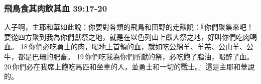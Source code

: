 \subsubsection{飛鳥食其肉飲其血 39:17-20}
人子啊，主耶和華如此說：你要對各類的飛鳥和田野的走獸說：『你們聚集來吧！要從四方聚到我為你們獻祭之地，就是在以色列山上獻大祭之地，好叫你們吃肉喝血。 18 你們必吃勇士的肉，喝地上首領的血，就如吃公綿羊、羊羔、公山羊、公牛，都是巴珊的肥畜。 19 你們吃我為你們所獻的祭，必吃飽了脂油，喝醉了血。 20 你們必在我席上飽吃馬匹和坐車的人，並勇士和一切的戰士。』這是主耶和華說的。




















































 